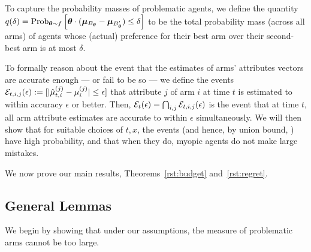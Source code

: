 To capture the probability masses of problematic agents,
we define the quantity
$\AlmostTied{\delta} = \Prob[\AgV \sim \AgentDist]{%
\AgV \cdot (\ArmV{\Best{\AgV}} - \ArmV{\Second{\AgV}}) \leq \delta}$
to be the total probability mass (across all arms) of agents
whose (actual) preference for their best arm over their second-best
arm is at most $\delta$.



To formally reason about the event that the estimates of arms'
attributes vectors are accurate enough --- or fail to be so ---
we define the events
${\mathcal E}_{t,i,j}(\epsilon) := [|\hat{\mu}_{t,i}^{(j)} - \mu_{i}^{(j)}| \leq \epsilon]$
that attribute $j$ of arm $i$ at time $t$ is estimated to
within accuracy $\epsilon$ or better.
Then, 
${\mathcal E}_{t}(\epsilon) = \bigcap_{i,j} {\mathcal E}_{t,i,j}(\epsilon)$
is the event that at time $t$, all arm attribute
estimates are accurate to within $\epsilon$ simultaneously.
We will then show that for suitable choices of $t, x$,
the events 
(and hence, by union bound, )
have high probability,
and that when they do, myopic agents do not make large mistakes.

We now prove our main results, Theorems~\ref{rst:budget} and~\ref{rst:regret}.

\subsection{General Lemmas}

We begin by showing that under our assumptions, the measure of
problematic arms cannot be too large.

